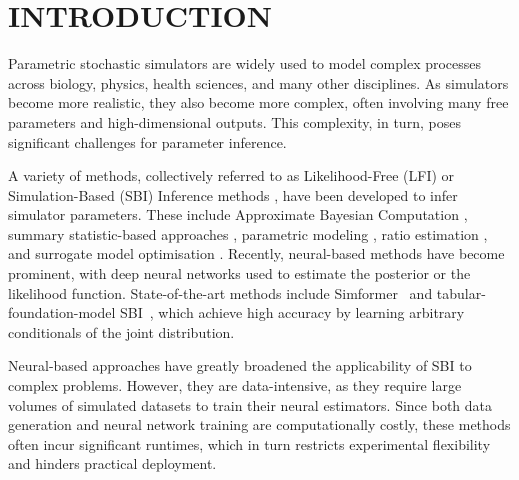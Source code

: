 \documentclass[twoside]{article}
\newlength{\secvspace}
\begin{document}
\vspace{\secvspace}
\section{INTRODUCTION}
\vspace{\secvspace}

Parametric stochastic simulators are widely used to model complex processes across biology, physics, health sciences, and many other disciplines.
As simulators become more realistic, they also become more complex, often involving many free parameters and high-dimensional outputs.
This complexity, in turn, poses significant challenges for parameter inference.

A variety of methods, collectively referred to as Likelihood-Free (LFI) or Simulation-Based (SBI) Inference methods \citep{lintusaari2017fundamentals, sisson2018handbook, cranmer2020frontier, deistler2025simulation, arruda2025diffusion}, have been developed to infer simulator parameters.
These include Approximate Bayesian Computation \citep[ABC,][]{Marin2012}, summary statistic-based approaches \citep{Chen2021a, Chen2023}, parametric modeling \citep{wood2010statistical, price2018bayesian, pacchiardi2024generalized}, ratio estimation \citep{thomas2022likelihood, durkan2020contrastive}, and surrogate model optimisation \citep{gutmann2016bayesian, jarvenpaa2025surrogate}.
Recently, neural-based methods have become prominent, with deep neural networks used to estimate the posterior \citep{greenberg2019automatic, papamakarios2016fast, radev2020bayesflow, wildberger2023flow} or the likelihood \citep{papamakarios2019sequential} function.
State-of-the-art methods include Simformer~\citep{gloeckler2024allinone} and tabular-foundation-model SBI~\citep{vetter2025effortless}, which achieve high accuracy by learning arbitrary conditionals of the joint distribution.

Neural-based approaches have greatly broadened the applicability of SBI to complex problems.
However, they are data-intensive, as they require large volumes of simulated datasets to train their neural estimators.
Since both data generation %
and neural network training are computationally costly, these methods often incur significant runtimes, which in turn restricts experimental flexibility and hinders practical deployment.
\end{document}

